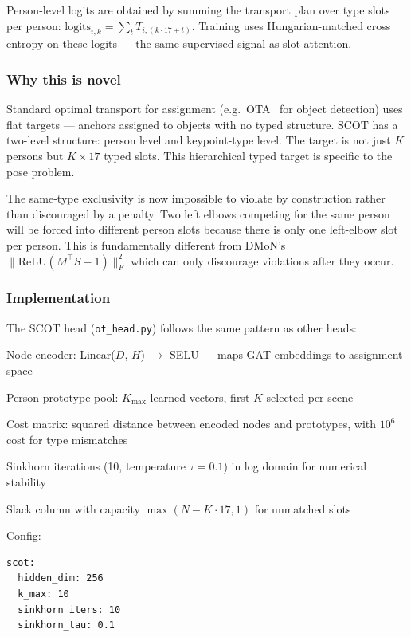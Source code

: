Person-level logits are obtained by summing the transport plan over type slots per person: $\mathrm{logits}_{i,k} = \sum_t T_{i,(k \cdot 17 + t)}$. Training uses Hungarian-matched cross entropy on these logits --- the same supervised signal as slot attention.

\subsubsection{Why this is novel}

Standard optimal transport for assignment (e.g.\ OTA~\cite{ge2021ota} for object detection) uses flat targets --- anchors assigned to objects with no typed structure. SCOT has a two-level structure: person level and keypoint-type level. The target is not just $K$ persons but $K \times 17$ typed slots. This hierarchical typed target is specific to the pose problem.

The same-type exclusivity is now impossible to violate by construction rather than discouraged by a penalty. Two left elbows competing for the same person will be forced into different person slots because there is only one left-elbow slot per person. This is fundamentally different from DMoN's $\|\mathrm{ReLU}(M^\top S - 1)\|_F^2$ which can only discourage violations after they occur.


\subsubsection{Implementation}

The SCOT head (\texttt{ot\_head.py}) follows the same pattern as other heads:

\begin{compactitem}
  \item Node encoder: Linear($D$, $H$) $\to$ SELU --- maps GAT embeddings to assignment space
  \item Person prototype pool: $K_{\max}$ learned vectors, first $K$ selected per scene
  \item Cost matrix: squared distance between encoded nodes and prototypes, with $10^6$ cost for type mismatches
  \item Sinkhorn iterations (10, temperature $\tau = 0.1$) in log domain for numerical stability
  \item Slack column with capacity $\max(N - K \cdot 17, 1)$ for unmatched slots
\end{compactitem}

Config:
\begin{lstlisting}[style=pythonstyle]
scot:
  hidden_dim: 256
  k_max: 10
  sinkhorn_iters: 10
  sinkhorn_tau: 0.1
\end{lstlisting}

